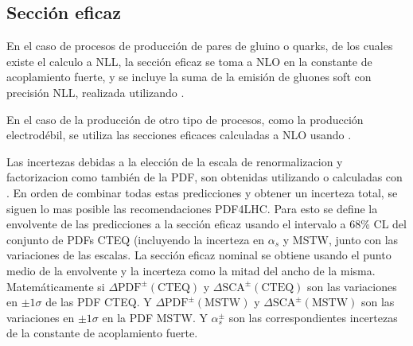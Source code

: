 \subsection{Sección eficaz}


En el caso de procesos de producción de pares de gluino o quarks, de los cuales
existe el calculo a NLL, la sección eficaz se toma a NLO en la constante de acoplamiento
fuerte, y se incluye la suma de la emisión de gluones soft con precisión NLL,
realizada utilizando {\nllfast}\cite{Kramer:2012bx,Beenakker:1996ch,Kulesza:2008jb,Kulesza:2009kq,Beenakker:2009ha,Beenakker:2011fu}
.

En el caso de la producción de otro tipo de procesos, como la producción electrodébil, se utiliza
las secciones eficaces calculadas a NLO usando {\prospino}.


\newcommand{\pdfcteqpm}{\ensuremath{\Delta\mathrm{PDF}^{\pm}(\mathrm{CTEQ})}}
\newcommand{\scacteqpm}{\ensuremath{\Delta\mathrm{SCA}^{\pm}(\mathrm{CTEQ})}}

\newcommand{\pdfmstwpm}{\ensuremath{\Delta\mathrm{PDF}^{\pm}(\mathrm{MSTW})}}
\newcommand{\scamstwpm}{\ensuremath{\Delta\mathrm{SCA}^{\pm}(\mathrm{MSTW})}}

\newcommand{\alphap}{\ensuremath{\alpha_s_+}}
\newcommand{\alpham}{\ensuremath{\alpha_s^-}}
\newcommand{\alphapm}{\ensuremath{\alpha_s^{\pm}}}

Las incertezas debidas a la elección de la escala de renormalizacion y
factorizacion como también de la PDF, son obtenidas utilizando {\nllfast} o
calculadas con {\prospino}. En orden de combinar todas estas predicciones y
obtener un incerteza total, se siguen lo mas posible las recomendaciones
PDF4LHC\cite{Botje:2011sn}. Para esto se define la envolvente de las predicciones a la sección eficaz
usando el intervalo a 68\% CL del conjunto de PDFs CTEQ (incluyendo la incerteza en $\alpha_s$ y MSTW,
junto con las variaciones de las escalas. La sección eficaz nominal se obtiene usando el punto medio
de la envolvente y la incerteza como la mitad del ancho de la misma. Matemáticamente
si {\pdfcteqpm} y {\scacteqpm} son las variaciones en $\pm 1\sigma$ de las PDF CTEQ.
Y {\pdfmstwpm} y {\scamstwpm} son las variaciones en $\pm 1\sigma$ en la PDF MSTW.
Y {\alphapm} son las correspondientes incertezas de la constante de acoplamiento fuerte.

